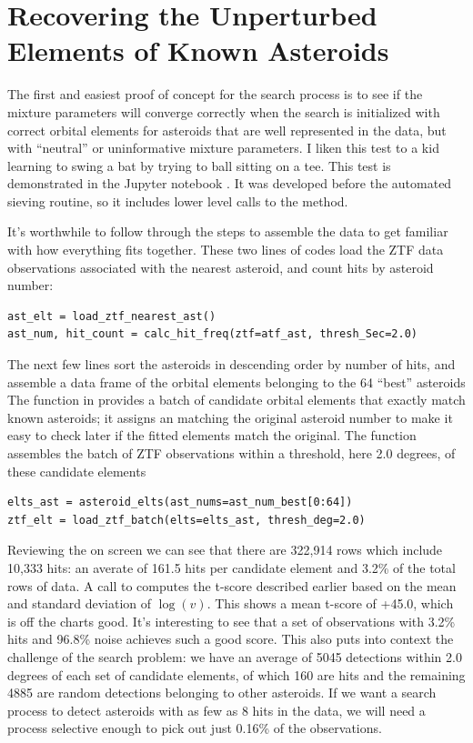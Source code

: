 \section{Recovering the Unperturbed Elements of Known Asteroids}
\label{section_results_known_ast_unperturbed}

The first and easiest proof of concept for the search process is to see if the mixture parameters will converge correctly
when the search is initialized with correct orbital elements for asteroids that are well represented in the data,
but with ``neutral'' or uninformative mixture parameters.
I liken this test to a kid learning to swing a bat by trying to ball sitting on a tee.
This test is demonstrated in the Jupyter notebook .
It was developed before the automated sieving routine, so it includes lower level calls to the  method.

It's worthwhile to follow through the steps to assemble the data to get familiar with how everything fits together.
These two lines of codes load the ZTF data observations associated with the nearest asteroid, and count hits by asteroid number:
\begin{lstlisting}[style=CodeSnippet]
ast_elt = load_ztf_nearest_ast()
ast_num, hit_count = calc_hit_freq(ztf=atf_ast, thresh_Sec=2.0)
\end{lstlisting}
The next few lines sort the asteroids in descending order by number of hits, 
and assemble a data frame of the orbital elements belonging to the 64 ``best'' asteroids
The function  in  provides a batch of candidate orbital elements
that exactly match known asteroids; it assigns an  matching the original asteroid number to make it easy
to check later if the fitted elements match the original.
The function  assembles the batch of ZTF observations within a threshold, 
here 2.0 degrees, of these candidate elements
\begin{lstlisting}[style=CodeSnippet]
elts_ast = asteroid_elts(ast_nums=ast_num_best[0:64])
ztf_elt = load_ztf_batch(elts=elts_ast, thresh_deg=2.0)
\end{lstlisting}

Reviewing the  on screen we can see that there are 322,914 rows which include 10,333 hits:
an averate of 161.5 hits per candidate element and 3.2\% of the total rows of data.
A call to  computes the t-score described earlier based on the mean and standard deviation of $\log(v)$.
This shows a mean t-score of +45.0, which is off the charts good.
It's interesting to see that a set of observations with 3.2\% hits and 96.8\% noise achieves such a good score.
This also puts into context the challenge of the search problem: 
we have an average of 5045 detections within 2.0 degrees of each set of candidate elements,
of which 160 are hits and the remaining 4885 are random detections belonging to other asteroids.
If we want a search process to detect asteroids with as few as 8 hits in the data, 
we will need a process selective enough to pick out just 0.16\% of the observations.


